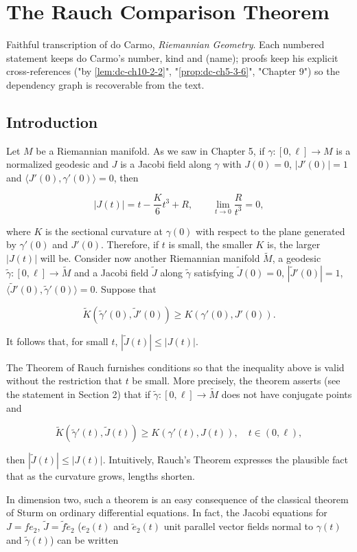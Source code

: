 \chapter{The Rauch Comparison Theorem}
\label{chap:dc-rauch-comparison-theorem}

Faithful transcription of do Carmo, \emph{Riemannian Geometry}. Each numbered
statement keeps do Carmo's number, kind and (name); proofs keep his explicit
cross-references ("by \cref{lem:dc-ch10-2-2}", "\cref{prop:dc-ch5-3-6}", "Chapter 9")
so the dependency graph is recoverable from the text.

\section{Introduction}

Let $M$ be a Riemannian manifold. As we saw in Chapter 5, if
$\gamma:[0,\ell]\to M$ is a normalized geodesic and $J$ is a Jacobi field along
$\gamma$ with $J(0)=0$, $|J'(0)|=1$ and $\langle J'(0),\gamma'(0)\rangle=0$, then

$$
|J(t)|=t-\frac{K}{6}t^3+R,\qquad\lim_{t\to 0}\frac{R}{t^3}=0,
$$

where $K$ is the sectional curvature at $\gamma(0)$ with respect to the plane
generated by $\gamma'(0)$ and $J'(0)$. Therefore, if $t$ is small, the smaller
$K$ is, the larger $|J(t)|$ will be. Consider now another Riemannian manifold
$\widetilde{M}$, a geodesic $\tilde\gamma:[0,\ell]\to\widetilde{M}$ and a Jacobi
field $\tilde J$ along $\tilde\gamma$ satisfying $\tilde J(0)=0$, $|\tilde J'(0)|=1$,
$\langle\tilde J'(0),\tilde\gamma'(0)\rangle=0$. Suppose that

$$
\widetilde{K}(\tilde\gamma'(0),\tilde J'(0))\geq K(\gamma'(0),J'(0)).
$$

It follows that, for small $t$, $|\tilde J(t)|\leq|J(t)|$.

The Theorem of Rauch furnishes conditions so that the inequality above is valid
without the restriction that $t$ be small. More precisely, the theorem asserts
(see the statement in Section 2) that if $\tilde\gamma:[0,\ell]\to\widetilde{M}$
does not have conjugate points and

$$
\widetilde{K}(\tilde\gamma'(t),\tilde J(t))\geq K(\gamma'(t),J(t)),\quad t\in(0,\ell),
$$

then $|\tilde J(t)|\leq|J(t)|$. Intuitively, Rauch's Theorem expresses the
plausible fact that as the curvature grows, lengths shorten.

In dimension two, such a theorem is an easy consequence of the classical theorem
of Sturm on ordinary differential equations. In fact, the Jacobi equations for
$J=fe_2$, $\tilde J=\tilde f\tilde e_2$ ($e_2(t)$ and $\tilde e_2(t)$ unit
parallel vector fields normal to $\gamma(t)$ and $\tilde\gamma(t)$) can be
written


